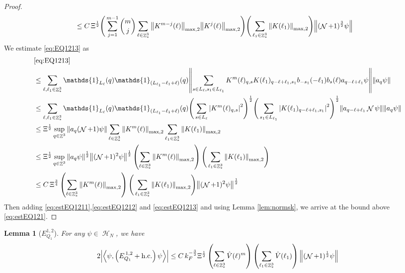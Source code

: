 \documentclass[sn-mathphys, Numbered ,a4paper]{sn-jnl}%
\DeclareMathOperator{\Z}{\mathbb{Z}}
\DeclareMathOperator{\HH}{\mathcal{H}}
\DeclareMathOperator{\NN}{\mathcal{N}}
\newcommand{\half}{\frac{1}{2}}
\newcommand{\eva}[1]{\left\langle #1 \right\rangle}
\theoremstyle{plain}
\newtheorem{lemma}[theorem]{Lemma}
\theoremstyle{definition}
\theoremstyle{remark}
\theoremstyle{plain}
\theoremstyle{definition}
\theoremstyle{remark}
\begin{document}
{\begin{proof}
\begin{alignat}{2}
	&\leq C\, \Xi^\half \Bigg(\sum\limits_{j=1}^{m-1} {{m}\choose j} \sum\limits_{\ell \in \Z^3_*} \norm{K^{m-j}(\ell)}_{ \mathrm{max,2} } \norm{K^{j}(\ell)}_{\mathrm{max,2}}\Bigg) \Bigg(\sum\limits_{ \ell_1\in \Z^3_*}\norm{  K(\ell_1)}_{\mathrm{max,2}}\Bigg)  \norm{(\NN+1)^\frac{3}{2} \psi} \label{eq:estEQ1212}
\end{alignat} 
We estimate \eqref{eq:EQ1213} as
\begin{align}
	&\eqref{eq:EQ1213}\nonumber\\
	&\leq\sum\limits_{\ell, \ell_1\in \Z^3_*} \mathds{1}_{L_{\ell}}(q)  \mathds{1}_{(L_{\ell_1}-\ell_1+\ell)}(q)  \norm{ \sum\limits_{s\in L_{\ell}, s_1 \in L_{\ell_1}} K^m(\ell)_{q,s}K(\ell_1)_{q-\ell+\ell_1,s_1} b_{-s_1}(-\ell_1) b_{s}(\ell) a_{q-\ell+\ell_1}\psi}\norm{ a_{q}\psi }\nonumber\\
	&\leq\sum\limits_{\ell, \ell_1\in \Z^3_*}  \mathds{1}_{L_{\ell}}(q) \mathds{1}_{(L_{\ell_1}-\ell_1+\ell)}(q) \Bigg(\sum\limits_{s \in L_{\ell}} \abs{K^m(\ell)_{q,s}}^2\Bigg)^\half \Bigg(\sum\limits_{s_1 \in L_{\ell_1}} \abs{K(\ell_1)_{q-\ell+\ell_1,s_1}}^2\Bigg)^\half \norm{ a_{q-\ell+\ell_1} \NN\psi} \norm{ a_{q}\psi }\nonumber\\
	&\leq \Xi^\half \sup_{q \in \Z^3}\norm{ a_{q} (\NN+1)\psi}\sum\limits_{\ell \in \Z^3_*} \norm{  K^{m}(\ell)}_{\mathrm{max,2}}  \sum\limits_{\ell_1 \in \Z^3_*} \norm{K(\ell_1)}_{\mathrm{max,2}} \nonumber\\
	&\leq  \Xi^\half  \sup_{q \in \Z^3}\norm{ a_{q} \psi}^\half \norm{ (\NN+1)^2\psi}^\half \left(\sum\limits_{\ell \in \Z^3_*} \norm{K^m(\ell)}_{\mathrm{max,2}}\right)\Bigg(\sum\limits_{\ell_1 \in \Z^3_*} \norm{K(\ell_1)}_{\mathrm{max,2}}\Bigg) \nonumber\\
	&\leq C\, \Xi^{\frac{3}{4}} \left(\sum\limits_{\ell \in \Z^3_*} \norm{K^m(\ell)}_{\mathrm{max,2}}\right)\Bigg(\sum\limits_{\ell_1 \in \Z^3_*} \norm{K(\ell_1)}_{\mathrm{max,2}} \Bigg)  \norm{ (\NN+1)^2\psi}^\half \label{eq:estEQ1213}
\end{align}
Then adding \eqref{eq:estEQ1211},\eqref{eq:estEQ1212} and \eqref{eq:estEQ1213} and using Lemma \ref{lem:normsk}, we arrive at the bound above \eqref{eq:estEQ121}.
\end{proof}}
\begin{lemma}[$E_{Q_1}^{1,2}$]\label{lem:EQ112}
For any $\psi \in \HH_N$, we have
\begin{equation}
	2\abs{\eva{\psi,\left(E^{\,1,2}_{Q_1}+\mathrm{h.c.}\right) \psi }}\nonumber
	\leq C\, k_{F}^{-\frac{3}{2}} \Xi^{\half} \left(\sum\limits_{\ell\in \Z^3_*} \hat{V}(\ell)^m \right) \left(\sum\limits_{\ell_1\in \Z^3_*} \hat{V}(\ell_1) \right) \norm{(\NN+1)^\half \psi } \label{eq:estEQ112}
\end{equation}
\end{lemma}
\end{document}
